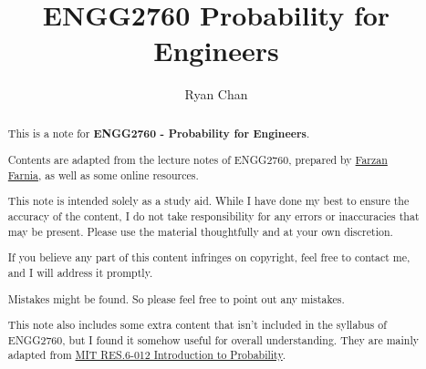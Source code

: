 \documentclass[a4paper]{report}
\author{Ryan Chan}
\title{ENGG2760 Probability for Engineers}
\begin{document}
\setlength\parindent{0pt}


\maketitle

\newpage

\begin{abstract}
	This is a note for \textbf{ENGG2760 - Probability for Engineers}. 
	
	Contents are adapted from the lecture notes of ENGG2760, prepared by \href{https://www.cse.cuhk.edu.hk/~farnia/}{Farzan Farnia}, as well as some online resources.

	This note is intended solely as a study aid. While I have done my best to ensure the accuracy of the content, I do not take responsibility for any errors or inaccuracies that may be present. Please use the material thoughtfully and at your own discretion.
	
	If you believe any part of this content infringes on copyright, feel free to contact me, and I will address it promptly.

	Mistakes might be found. So please feel free to point out any mistakes.

	This note also includes some extra content that isn't included in the syllabus of ENGG2760, but I found it somehow useful for overall understanding. They are mainly adapted from \href{https://ocw.mit.edu/RES-6-012S18}{MIT RES.6-012 Introduction to Probability}.
\end{abstract}

\newpage

\tableofcontents

\setlength{\parskip}{5pt}
\appendix

\end{document}

